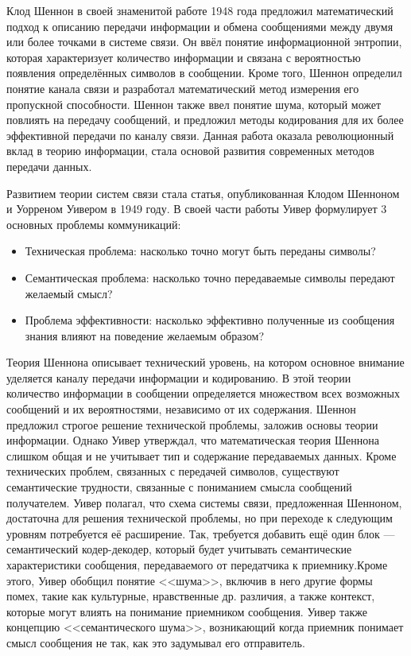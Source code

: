 \documentclass[a4paper,12pt]{article}
\begin{document}
	Клод Шеннон в своей знаменитой работе \cite{shannon1948comm} 1948 года предложил математический подход к описанию передачи информации и обмена сообщениями между двумя или более точками в системе связи. Он ввёл понятие информационной энтропии, которая характеризует количество информации и связана с вероятностью появления определённых символов в сообщении. Кроме того, Шеннон определил понятие канала связи и разработал математический метод измерения его пропускной способности. Шеннон также ввел понятие шума, который может повлиять на передачу сообщений, и предложил методы кодирования для их более эффективной передачи по каналу связи. Данная работа оказала революционный вклад в теорию информации, стала основой развития современных методов передачи данных.
	
	Развитием теории систем связи стала статья, опубликованная Клодом Шенноном и Уорреном Уивером в 1949 году. В своей части работы Уивер формулирует 3 основных проблемы коммуникаций:
	
	\begin{itemize}
		\item Техническая проблема: насколько точно могут быть переданы символы?
		\item Семантическая проблема: насколько точно передаваемые символы передают желаемый смысл?
		\item Проблема эффективности: насколько эффективно полученные из сообщения знания влияют на поведение желаемым образом? 
	\end{itemize}
	
	Теория Шеннона описывает технический уровень, на котором основное внимание уделяется каналу передачи информации и кодированию. В этой теории количество информации в сообщении определяется множеством всех возможных сообщений и их вероятностями, независимо от их содержания. Шеннон предложил строгое решение технической проблемы, заложив основы теории информации. Однако Уивер утверждал, что математическая теория Шеннона слишком общая и не учитывает тип и содержание передаваемых данных. Кроме технических проблем, связанных с передачей символов, существуют семантические трудности, связанные с пониманием смысла сообщений получателем. Уивер полагал, что схема системы связи, предложенная Шенноном, достаточна для решения технической проблемы, но при переходе к следующим уровням потребуется её расширение. Так, требуется добавить ещё один блок --- семантический кодер-декодер, который будет учитывать семантические характеристики сообщения, передаваемого от передатчика к приемнику.Кроме этого, Уивер обобщил понятие <<шума>>, включив в него другие формы помех, такие как культурные, нравственные др. различия, а также контекст, которые могут влиять на понимание приемником сообщения. Уивер также концепцию <<семантического шума>>, возникающий когда приемник понимает смысл сообщения не так, как это задумывал его отправитель.
	
\end{document}

